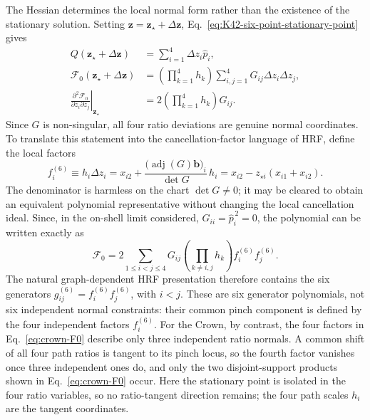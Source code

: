\documentclass[a4paper,11pt]{article}
\begin{document}
The Hessian determines the local normal form rather than the existence of
the stationary solution.  Setting
\(\boldsymbol z=\boldsymbol z_\star+\Delta\boldsymbol z\), Eq.~\eqref{eq:K42-six-point-stationary-point}
gives
\begin{align}
 Q(\boldsymbol z_\star+\Delta\boldsymbol z)
 &=\sum_{i=1}^4\Delta z_i\widehat p_i,\nonumber\\
 \mathcal F_0(\boldsymbol z_\star+\Delta\boldsymbol z)
 &=\left(\prod_{k=1}^4h_k\right)
   \sum_{i,j=1}^4G_{ij}\Delta z_i\Delta z_j,\nonumber\\
 \left.
 \frac{\partial^2\mathcal F_0}{\partial z_i\partial z_j}
 \right|_{\boldsymbol z_\star}
 &=2\left(\prod_{k=1}^4h_k\right)G_{ij}.
 \label{eq:K42-six-point-Hessian}
\end{align}
Since \(G\) is non-singular, all four ratio deviations are genuine normal
coordinates.  To translate this statement into the cancellation-factor
language of HRF, define the local factors
\[
 f_i^{(6)}\equiv h_i\Delta z_i
 =x_{i2}
  +\frac{\bigl(\operatorname{adj}(G)\boldsymbol b\bigr)_i}{\det G}\,h_i
 =x_{i2}-z_{\star i}(x_{i1}+x_{i2}).
\]
The denominator is harmless on the chart \(\det G\ne0\); it may be cleared to
obtain an equivalent polynomial representative without changing the local
cancellation ideal.  Since, in the on-shell limit considered,
\(G_{ii}=\widehat p_i^{\,2}=0\), the polynomial can be written exactly as
\[
 \mathcal F_0
 =2\sum_{1\leq i<j\leq4}G_{ij}
   \left(\prod_{k\ne i,j}h_k\right)f_i^{(6)}f_j^{(6)}.
\]
The natural graph-dependent HRF presentation therefore contains the six
generators \(g_{ij}^{(6)}=f_i^{(6)}f_j^{(6)}\), with \(i<j\).  These are six
generator polynomials, not six independent normal constraints: their common
pinch component is defined by the four independent factors \(f_i^{(6)}\).
For the Crown, by contrast, the four factors in Eq.~\eqref{eq:crown-F0}
describe only three independent ratio normals.  A common shift of all four
path ratios is tangent to its pinch locus, so the fourth factor vanishes once
three independent ones do, and only the two disjoint-support products shown
in Eq.~\eqref{eq:crown-F0} occur.  Here the stationary point is isolated in
the four ratio variables, so no ratio-tangent direction remains; the four
path scales \(h_i\) are the tangent coordinates.
\end{document}
